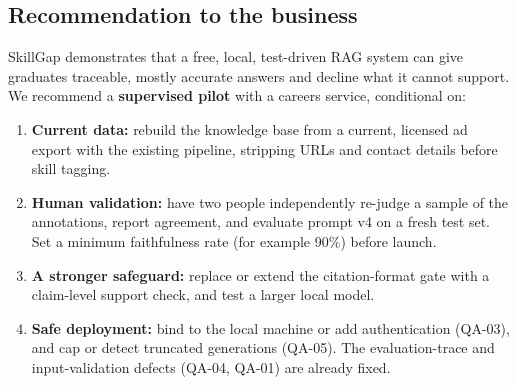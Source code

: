 \subsection{Recommendation to the business}\label{sec:recommendation}

SkillGap demonstrates that a free, local, test-driven RAG system can give graduates traceable, mostly accurate answers and decline what it cannot support. We recommend a \textbf{supervised pilot} with a careers service, conditional on:
\begin{enumerate}
  \item \textbf{Current data:} rebuild the knowledge base from a current, licensed ad export with the existing pipeline, stripping URLs and contact details before skill tagging.
  \item \textbf{Human validation:} have two people independently re-judge a sample of the annotations, report agreement, and evaluate prompt v4 on a fresh test set. Set a minimum faithfulness rate (for example 90\%) before launch.
  \item \textbf{A stronger safeguard:} replace or extend the citation-format gate with a claim-level support check, and test a larger local model.
  \item \textbf{Safe deployment:} bind to the local machine or add authentication (QA-03), and cap or detect truncated generations (QA-05). The evaluation-trace and input-validation defects (QA-04, QA-01) are already fixed.
\end{enumerate}
